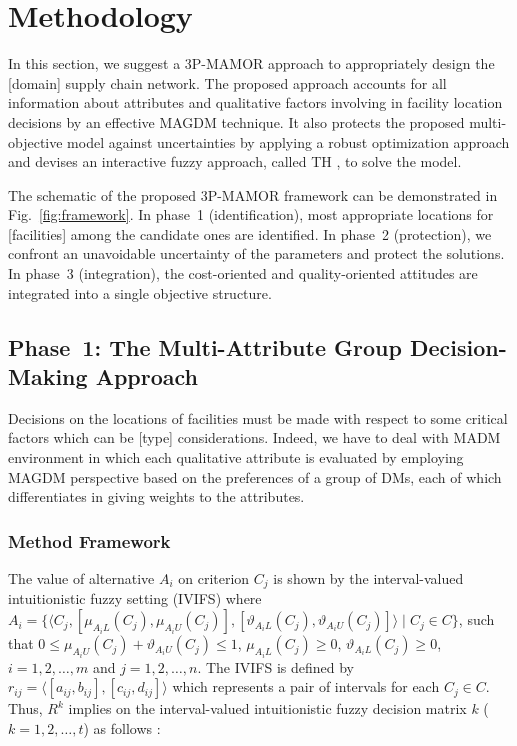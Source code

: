 \documentclass[10pt,twocolumn]{article}
\begin{document}
\section{Methodology}

In this section, we suggest a 3P-MAMOR approach to appropriately
design the [domain] supply chain network. The proposed approach
accounts for all information about attributes and qualitative factors
involving in facility location decisions by an effective MAGDM
technique. It also protects the proposed multi-objective model
against uncertainties by applying a robust optimization approach and
devises an interactive fuzzy approach, called TH
\cite{Samani2018,Torabi2008}, to solve the model.

The schematic of the proposed 3P-MAMOR framework can be
demonstrated in Fig.~\ref{fig:framework}. In phase~1
(identification), most appropriate locations for [facilities] among
the candidate ones are identified. In phase~2 (protection), we
confront an unavoidable uncertainty of the parameters and protect the
solutions. In phase~3 (integration), the cost-oriented and
quality-oriented attitudes are integrated into a single objective
structure.

\subsection{Phase~1: The Multi-Attribute Group Decision-Making
Approach}

Decisions on the locations of facilities must be made with respect to
some critical factors which can be [type] considerations. Indeed, we
have to deal with MADM environment in which each qualitative
attribute is evaluated by employing MAGDM perspective based on the
preferences of a group of DMs, each of which differentiates in giving
weights to the attributes.

\subsubsection{Method Framework}
The value of alternative $A_i$ on criterion $C_j$ is shown by the
interval-valued intuitionistic fuzzy setting (IVIFS) where
$A_i = \{\langle C_j, [\mu_{A_iL}(C_j), \mu_{A_iU}(C_j)],
[\vartheta_{A_iL}(C_j), \vartheta_{A_iU}(C_j)]\rangle \mid C_j \in C\}$,
such that $0 \le \mu_{A_iU}(C_j) + \vartheta_{A_iU}(C_j) \le 1$,
$\mu_{A_iL}(C_j) \ge 0$, $\vartheta_{A_iL}(C_j) \ge 0$,
$i = 1,2,\ldots,m$ and $j = 1,2,\ldots,n$. The IVIFS is defined by
$r_{ij} = \langle [a_{ij}, b_{ij}], [c_{ij}, d_{ij}]\rangle$
which represents a pair of intervals for each $C_j \in C$. Thus,
$R^k$ implies on the interval-valued intuitionistic fuzzy decision
matrix $k$ ($k = 1, 2, \ldots, t$) as follows \cite{Ye2013}:
\end{document}

